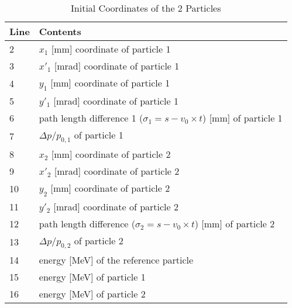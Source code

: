 \begin{table}[h]
    \caption{Initial Coordinates of the 2 Particles}
    \label{T-IniCoo}
    \centering
    \begin{tabular}{|l|l|}
        \hline
        \rowcolor{blue!30}
        Line & Contents \\
        \hline
        2 & $x_1$ [mm] coordinate of particle 1 \\
        \hline
        3 & $x'_1$ [mrad] coordinate of particle 1 \\
        \hline
        4 & $y_1$ [mm] coordinate of particle 1 \\
        \hline
        5 & $y'_1$ [mrad] coordinate of particle 1 \\
        \hline
        6 & path length difference 1 ($\sigma_1 = s - v_0 \times t$) [mm] of particle 1 \\
        \hline
        7 & $\Delta p/p_{0,1} $ of particle 1 \\
        \hline
        8 & $x_2$ [mm] coordinate of particle 2 \\
        \hline
        9 & $x'_2$ [mrad] coordinate of particle 2 \\
        \hline
        10 & $y_2$ [mm] coordinate of particle 2 \\
        \hline
        11 & $y'_2$ [mrad] coordinate of particle 2 \\
        \hline
        12 & path length difference ($ \sigma_2 = s - v_0 \times t$) [mm] of particle 2 \\
        \hline
        13 & $\Delta p/p_{0,2}$ of particle 2 \\
        \hline
        14 & energy [MeV] of the reference particle\index{reference energy} \\
        \hline
        15 & energy [MeV] of particle 1 \\
        \hline
        16 & energy [MeV] of particle 2 \\
        \hline
    \end{tabular}
\end{table}


